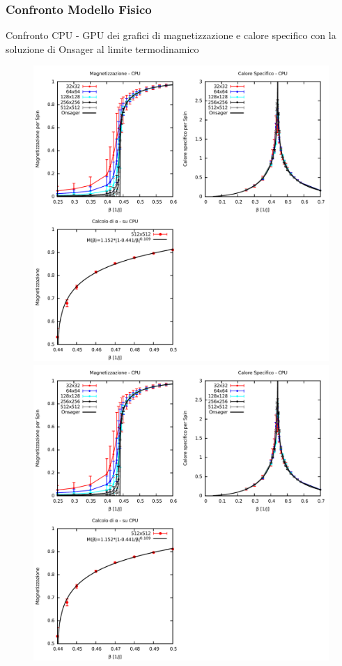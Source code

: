 \documentclass{beamer}
\begin{document}
	\begin{frame}
		\frametitle{Confronto Modello Fisico}
		Confronto CPU - GPU dei grafici di magnetizzazione e calore specifico con la soluzione di Onsager al limite termodinamico
		\begin{figure}
				\includegraphics[scale=0.18]{../../CPU/Result/Ising_Mag_Cv.pdf}	
				\includegraphics[scale=0.18]{../../CPU/Result/Ising_Mag_Cv.pdf}
		\end{figure}

	\end{frame}

	\begin{frame}
		\frametitle{}
	\end{frame}
\end{document}
